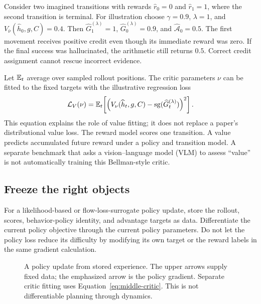 Consider two imagined transitions with rewards $\widehat r_0=0$ and $\widehat r_1=1$, where the second transition is terminal. For illustration choose $\gamma=0.9$, $\lambda=1$, and $V_{\bar\nu}(\widehat h_0,g,C)=0.4$. Then $\widehat G_1^{(\lambda)}=1$, $\widehat G_0^{(\lambda)}=0.9$, and $\widehat{\mathcal A}_0=0.5$. The first movement receives positive credit even though its immediate reward was zero. If the final success was hallucinated, the arithmetic still returns $0.5$. Correct credit assignment cannot rescue incorrect evidence.

Let $\mathbb{E}_t$ average over sampled rollout positions. The critic parameters $\nu$ can be fitted to the fixed targets with the illustrative regression loss
\begin{equation}
 \mathcal L_V(\nu)=\mathbb{E}_t\!\left[\left(V_\nu(\widehat h_t,g,C)-\operatorname{sg}(\widehat G_t^{(\lambda)})\right)^2\right].
 \label{eq:middle-critic}
\end{equation}
This equation explains the role of value fitting; it does not replace a paper's distributional value loss. The reward model scores one transition. A value predicts accumulated future reward under a policy and transition model. A separate benchmark that asks a vision--language model (VLM) to assess ``value'' is not automatically training this Bellman-style critic.

\subsection{Freeze the right objects}
For a likelihood-based or flow-loss-surrogate policy update, store the rollout, scores, behavior-policy identity, and advantage targets as data. Differentiate the current policy objective through the current policy parameters. Do not let the policy loss reduce its difficulty by modifying its own target or the reward labels in the same gradient calculation.

\begin{figure}[H]\centering
{}
\caption{A policy update from stored experience. The upper arrows supply fixed data; the emphasized arrow is the policy gradient. Separate critic fitting uses Equation~\eqref{eq:middle-critic}. This is not differentiable planning through dynamics.}
\label{fig:middle-gradients}
\end{figure}


